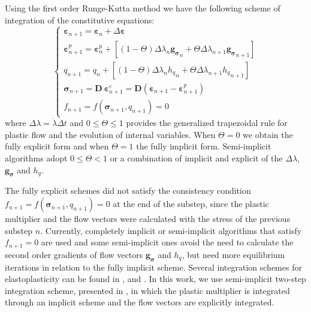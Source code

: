 \documentclass[Journal,letterpaper]{ascelike-new}
\newcommand{\dgds}{\boldsymbol{g_\sigma}}
\newcommand{\Dsdee}{\boldsymbol{D}}
\newcommand{\hl}{{h_q}}
\newcommand{\strain}{\boldsymbol{\varepsilon}}
\newcommand{\stress}{\boldsymbol{\sigma}}
\begin{document}
Using the first order Runge-Kutta method we have the following scheme of integration of the constitutive equations:
\begin{equation}
	\label{eq:esquema_int_constitutiva_ep}
	\left\{
\begin{array}{lcl}
	\strain_{n+1} = \strain_n + \Delta \strain \\
	\strain_{n+1}^p = \strain_n^p + \left[(1-\Theta) \Delta \lambda_n \dgds_n + \Theta \Delta \lambda_{n+1} \dgds_{n+1}\right] \\
	q_{n+1} = q_n + \left[(1-\Theta) \Delta \lambda_n \hl_n + \Theta \Delta \lambda_{n+1} \hl_{n+1}\right] \\	
	\stress_{n+1} = \Dsdee~\strain_{n+1}^e = \Dsdee( \strain_{n+1} - \strain_{n+1}^p) \\
	f_{n+1} = f(\stress_{n+1},q_{n+1}) = 0		
\end{array}
\right.
\end{equation}
where $\Delta \lambda = \dot\lambda\Delta t$ and $0 \leq \Theta \leq 1$ provides the generalized trapezoidal rule for  plastic flow and the evolution of internal variables. When $\Theta = 0$ we obtain the fully explicit form and when $\Theta = 1$ the fully implicit form. Semi-implicit algorithms adopt $0 \leq \Theta < 1$ or a combination of implicit and explicit of the $\Delta \lambda$, $\dgds$ and $\hl$. 

The fully explicit schemes did not satisfy the consistency condition $f_{n+1}=f(\stress_{n+1},q_{n+1})=0$ at the end of the substep, since the plastic multiplier and the flow vectors were calculated with the stress of the previous substep $n$. Currently, completely implicit or semi-implicit algorithms that satisfy $f_{n+1} = 0$ are used and some semi-implicit ones avoid the need to calculate the second order gradients of flow vectors $\dgds$ and $\hl$, but need more equilibrium iterations in relation to the fully implicit scheme. Several integration schemes for elastoplasticity can be found in ,  and . In this work, we use semi-implicit two-step integration scheme, presented in , in which the plastic multiplier is integrated through an implicit scheme and the flow vectors are explicitly integrated.
\end{document}
